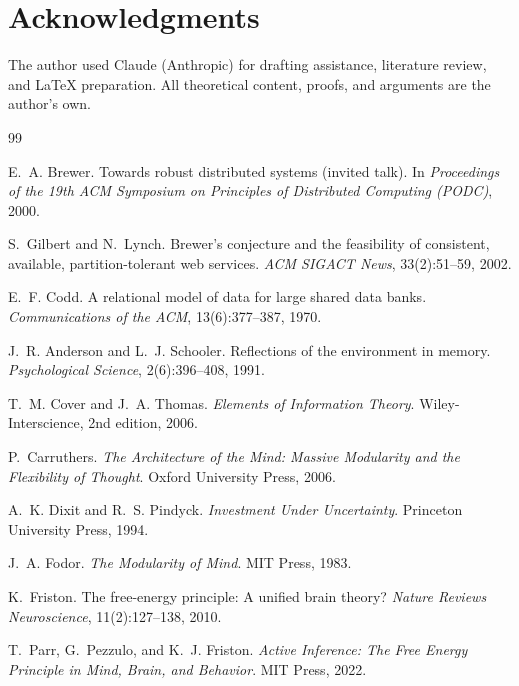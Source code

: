 \documentclass[11pt]{article}
\theoremstyle{definition}
\theoremstyle{remark}
\begin{document}
\section*{Acknowledgments}

The author used Claude (Anthropic) for drafting assistance, literature review, and \LaTeX{} preparation. All theoretical content, proofs, and arguments are the author's own.


\begin{thebibliography}{99}

E.~A. Brewer.
\newblock Towards robust distributed systems (invited talk).
\newblock In \emph{Proceedings of the 19th ACM Symposium on Principles of
  Distributed Computing (PODC)}, 2000.

S.~Gilbert and N.~Lynch.
\newblock Brewer's conjecture and the feasibility of consistent, available,
  partition-tolerant web services.
\newblock \emph{ACM SIGACT News}, 33(2):51--59, 2002.

E.~F. Codd.
\newblock A relational model of data for large shared data banks.
\newblock \emph{Communications of the ACM}, 13(6):377--387, 1970.

J.~R. Anderson and L.~J. Schooler.
\newblock Reflections of the environment in memory.
\newblock \emph{Psychological Science}, 2(6):396--408, 1991.

T.~M. Cover and J.~A. Thomas.
\newblock \emph{Elements of Information Theory}.
\newblock Wiley-Interscience, 2nd edition, 2006.

P.~Carruthers.
\newblock \emph{The Architecture of the Mind: Massive Modularity and the
  Flexibility of Thought}.
\newblock Oxford University Press, 2006.

A.~K. Dixit and R.~S. Pindyck.
\newblock \emph{Investment Under Uncertainty}.
\newblock Princeton University Press, 1994.



J.~A. Fodor.
\newblock \emph{The Modularity of Mind}.
\newblock MIT Press, 1983.

K.~Friston.
\newblock The free-energy principle: A unified brain theory?
\newblock \emph{Nature Reviews Neuroscience}, 11(2):127--138, 2010.

T.~Parr, G.~Pezzulo, and K.~J. Friston.
\newblock \emph{Active Inference: The Free Energy Principle in Mind, Brain, and
  Behavior}.
\newblock MIT Press, 2022.


\end{thebibliography}
\end{document}
